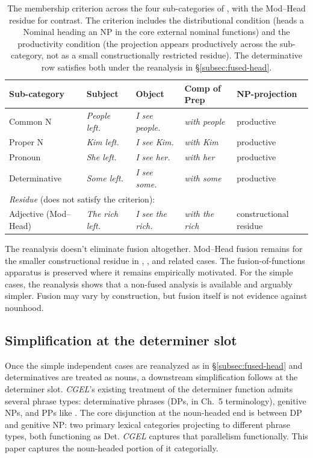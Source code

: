 \documentclass[12pt]{article}
\begin{document}
\begin{table}[h]
\centering
\caption{The membership criterion across the four sub-categories of , with the Mod--Head residue for contrast. The criterion includes the distributional condition (heads a Nominal heading an NP in the core external nominal functions) and the productivity condition (the projection appears productively across the sub-category, not as a small constructionally restricted residue). The determinative row satisfies both under the reanalysis in §\ref{subsec:fused-head}.}\label{tab:diagnostic}
\begin{tabular}{lllll}
\hline
Sub-category & Subject & Object & Comp of Prep & NP-projection \\
\hline
Common N & \textit{People left.} & \textit{I see people.} & \textit{with people} & productive \\
Proper N & \textit{Kim left.} & \textit{I see Kim.} & \textit{with Kim} & productive \\
Pronoun & \textit{She left.} & \textit{I see her.} & \textit{with her} & productive \\
Determinative & \textit{Some left.} & \textit{I see some.} & \textit{with some} & productive \\
\hline
\multicolumn{5}{l}{\emph{Residue} (does not satisfy the criterion):} \\
Adjective (Mod--Head) & \textit{The rich left.} & \textit{I see the rich.} & \textit{with the rich} & constructional residue \\
\hline
\end{tabular}
\end{table}

The reanalysis doesn't eliminate fusion altogether. Mod--Head fusion remains for the smaller constructional residue in , , and related cases. The fusion-of-functions apparatus is preserved where it remains empirically motivated. For the simple cases, the reanalysis shows that a non-fused analysis is available and arguably simpler. Fusion may vary by construction, but fusion itself is not evidence against nounhood.

\subsection{Simplification at the determiner slot}\label{subsec:det-uniform}

Once the simple independent cases are reanalyzed as in §\ref{subsec:fused-head} and determinatives are treated as nouns, a downstream simplification follows at the determiner slot. \textit{CGEL}'s existing treatment of the determiner function admits several phrase types: determinative phrases (DPs, in Ch.~5 terminology), genitive NPs, and PPs like  \citep[Ch.~5 §4-5]{huddleston2002}. The core disjunction at the noun-headed end is between DP and genitive NP: two primary lexical categories projecting to different phrase types, both functioning as Det. \textit{CGEL} captures that parallelism functionally. This paper captures the noun-headed portion of it categorially.
\end{document}
